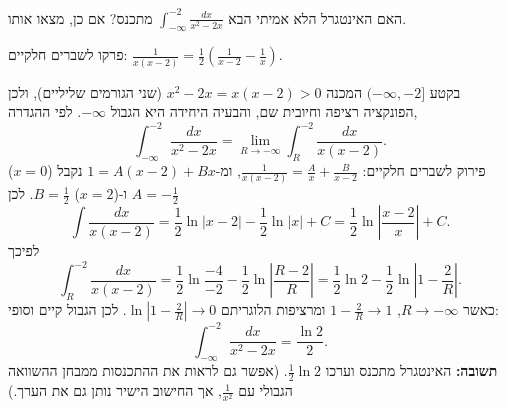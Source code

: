 
\begin{question}
האם האינטגרל הלא אמיתי הבא $\displaystyle\int_{-\infty}^{-2}\frac{dx}{x^2-2x}$ מתכנס? אם כן, מצאו אותו.
\end{question}

\begin{hint}
פרקו לשברים חלקיים: $\frac{1}{x(x-2)}=\frac12\left(\frac{1}{x-2}-\frac1x\right)$.
\end{hint}

\begin{solution}
בקטע $(-\infty,-2]$ המכנה $x^2-2x=x(x-2)>0$ (שני הגורמים שליליים), ולכן הפונקציה רציפה וחיובית שם, והבעיה היחידה היא הגבול $-\infty$. לפי ההגדרה,
\[ \int_{-\infty}^{-2}\frac{dx}{x^2-2x} = \lim_{R\to-\infty}\int_R^{-2}\frac{dx}{x(x-2)}. \]
פירוק לשברים חלקיים: $\frac{1}{x(x-2)}=\frac{A}{x}+\frac{B}{x-2}$, ומ-$1=A(x-2)+Bx$ נקבל ($x=0$) $A=-\frac12$ ו-($x=2$) $B=\frac12$. לכן
\[ \int\frac{dx}{x(x-2)} = \frac12\ln|x-2|-\frac12\ln|x| + C = \frac12\ln\left|\frac{x-2}{x}\right| + C. \]
לפיכך
\[ \int_R^{-2}\frac{dx}{x(x-2)} = \frac12\ln\frac{-4}{-2} - \frac12\ln\left|\frac{R-2}{R}\right| = \frac12\ln2-\frac12\ln\left|1-\frac2R\right|. \]
כאשר $R\to-\infty$, $1-\frac2R\to1$ ומרציפות הלוגריתם $\ln\left|1-\frac2R\right|\to0$. לכן הגבול קיים וסופי:
\[ \int_{-\infty}^{-2}\frac{dx}{x^2-2x} = \frac{\ln2}{2}. \]
\textbf{תשובה:} האינטגרל מתכנס וערכו $\frac12\ln2$.
(אפשר גם לראות את ההתכנסות ממבחן ההשוואה הגבולי עם $\frac1{x^2}$, אך החישוב הישיר נותן גם את הערך.)
\end{solution}
